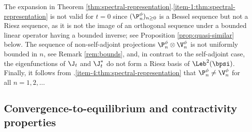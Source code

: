 The expansion in Theorem \ref{thm:spectral-representation}.\eqref{item-1:thm:spectral-representation} is not valid for $t =0$ since $(\P_n^\phi)_{n \geq 0}$ is a Bessel sequence but not a Riesz sequence, as it is not the image of an orthogonal sequence under a bounded linear operator having a bounded inverse; see Proposition \ref{prop:quasi-similar} below. The sequence of non-self-adjoint projections $\P_n^\phi \otimes \V_n^\phi$ is not uniformly bounded in $n$, see Remark \ref{rem:bounds}, and, in contrast to the self-adjoint case, the eigenfunctions of $\J_t$ and $\J_t^*$ do not form a Riesz basis of $\Leb^2(\bpsi)$. Finally, it follows from .\eqref{item-4:thm:spectral-representation} that $\P_n^\phi \neq \V_n^\phi$ for all $n = 1,2,\ldots$

\subsection{Convergence-to-equilibrium and contractivity properties}

